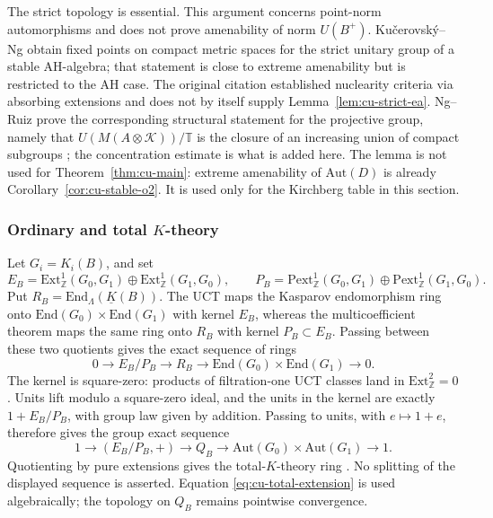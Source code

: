 \begin{remark}\label{rem:cu-remark-4}
The strict topology is essential. This argument concerns point-norm
automorphisms and does not prove amenability of norm $U(B^+)$. Ku\v{c}erovsk\'y--Ng \cite[Theorem~3.11]{KucerovskyNg2009} obtain fixed points on compact
metric spaces for the strict unitary group of a stable AH-algebra; that
statement is close to extreme amenability but is restricted to the AH case.
The original citation \cite{KucerovskyNg2010} established nuclearity criteria via
absorbing extensions and does not by itself supply Lemma~\ref{lem:cu-strict-ea}. Ng--Ruiz prove the corresponding structural statement for the projective
group, namely that $U(M(A\otimes\mathcal{K}))/\mathbb{T}$ is the closure of
an increasing union of compact subgroups \cite[Theorem 4.2(ii)]{NgRuiz2012}; the
concentration estimate is what is added here. The lemma is not used for
Theorem~\ref{thm:cu-main}: extreme amenability of $\mathrm{Aut}(D)$ is already
Corollary~\ref{cor:cu-stable-o2}. It is used only for the Kirchberg table in
this section.
\end{remark}


\subsubsection{Ordinary and total \(K\)-theory}

Let $G_i=K_i(B)$, and set 
\begin{equation*}
E_B=\mathrm{Ext}^1_\mathbb{Z}(G_0,G_1)\oplus\mathrm{Ext}^1_\mathbb{Z}(G_1,G_0),\qquad P_B=\mathrm{Pext}^1_\mathbb{Z}(G_0,G_1)\oplus\mathrm{Pext}^1_\mathbb{Z}(G_1,G_0).
\end{equation*}
Put $R_B=\mathrm{End}_\Lambda(\underline K(B))$. The UCT maps the Kasparov
endomorphism ring onto $\mathrm{End}(G_0)\times\mathrm{End}(G_1)$ with
kernel $E_B$, whereas the multicoefficient theorem maps the same ring onto $R_B$ with kernel $P_B\subset E_B$. Passing between these two quotients gives
the exact sequence of rings 
\begin{equation*}
0\longrightarrow E_B/P_B\longrightarrow R_B \longrightarrow\mathrm{End}(G_0)\times\mathrm{End}(G_1)\longrightarrow0.
\end{equation*}
The kernel is square-zero: products of filtration-one UCT classes land in $\mathrm{Ext}^2_\mathbb{Z}=0$. Units lift modulo a square-zero ideal, and the
units in the kernel are exactly $1+E_B/P_B$, with group law given by
addition. Passing to units, with $e\mapsto1+e$, therefore gives the group
exact sequence 
\begin{equation}  \label{eq:cu-total-extension}
1\longrightarrow(E_B/P_B,+)\longrightarrow Q_B \longrightarrow\mathrm{Aut}(G_0)\times\mathrm{Aut}(G_1)\longrightarrow1.
\end{equation}
Quotienting by pure extensions gives the total-$K$-theory ring \cite{RosenbergSchochet1987,DadarlatLoring1996,Dadarlat2005}. No splitting of the displayed sequence is asserted.
Equation \eqref{eq:cu-total-extension} is used algebraically; the topology on $Q_B$ remains pointwise convergence.

